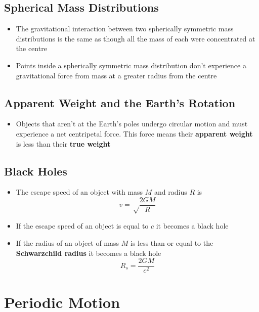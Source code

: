 \documentclass{article}
\begin{document}
\subsection{Spherical Mass Distributions}

\begin{itemize}
    \item The gravitational interaction between two spherically symmetric mass distributions is the same as though all the mass of each were concentrated at the centre

    \item Points inside a spherically symmetric mass distribution don't experience a gravitational force from mass at a greater radius from the centre
\end{itemize}

\subsection{Apparent Weight and the Earth's Rotation}

\begin{itemize}
    \item Objects that aren't at the Earth's poles undergo circular motion and must experience a net centripetal force. This force means their \textbf{apparent weight} is less than their \textbf{true weight}
\end{itemize}

\subsection{Black Holes}

\begin{itemize}
    \item The escape speed of an object with mass $M$ and radius $R$ is \[v= \sqrt \frac {2GM} R\]

    \item If the escape speed of an object is equal to $c$ it becomes a black hole

    \item If the radius of an object of mass $M$ is less than or equal to the \textbf{Schwarzchild radius} it becomes a black hole \[R_s = \frac {2GM} {c^2}\]
\end{itemize}

\section{Periodic Motion}
\end{document}
